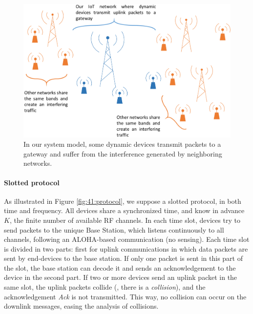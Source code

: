 \begin{figure}[!t]
    \centering
    \includegraphics[width=0.70\linewidth]{system_model1.eps}
    \caption{In our system model, some dynamic devices transmit packets to a gateway and suffer from the interference generated by neighboring networks.}
    \label{fig:41:system_model1}
\end{figure}


\paragraph{Slotted protocol}
%
As illustrated in Figure \ref{fig:41:protocol}, we suppose a slotted protocol, in both time and frequency.
All devices share a synchronized time, and know in advance $K$, the finite number of available RF channels.
In each time slot, devices try to send packets to the unique Base Station, which listens continuously to all channels, following an ALOHA-based communication (no sensing).
Each time slot is divided in two parts: first for uplink communications in which data packets are sent by end-devices to the base station. If only one packet is sent in this part of the slot, the base station can decode it and sends an acknowledgement to the device in the second part.
If two or more devices send an uplink packet in the same slot, the uplink packets collide (\ie, there is a \emph{collision}), and the acknowledgement \emph{Ack} is not transmitted.
This way, no collision can occur on the downlink messages, easing the analysis of collisions.

